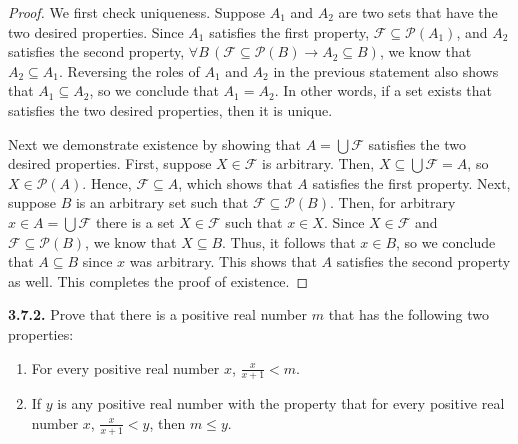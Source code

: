 \documentclass[12pt]{amsart}
\newenvironment{statement}[1]{\smallskip\noindent\color[rgb]{.6627, .3529, .6314} {\bf #1.}}{}
\theoremstyle{definition}
\theoremstyle{remark}
\newcommand{\powerset}[1]{\mathscr{P} \left( #1 \right)}
\begin{document}
\begin{proof}
We first check uniqueness.
Suppose $A_1$ and $A_2$ are two sets that have the two desired properties.
Since $A_1$ satisfies the first property, $\mathcal{F} \subseteq \powerset{A_1}$, and $A_2$ satisfies the second property, $\forall B \, (\mathcal{F} \subseteq \powerset{B} \rightarrow A_2 \subseteq B)$, we know that $A_2 \subseteq A_1$.
Reversing the roles of $A_1$ and $A_2$ in the previous statement also shows that $A_1 \subseteq A_2$, so we conclude that $A_1 = A_2$.
In other words, if a set exists that satisfies the two desired properties, then it is unique.

Next we demonstrate existence by showing that $A = \bigcup \mathcal{F}$ satisfies the two desired properties.
First, suppose $X \in \mathcal{F}$ is arbitrary.
Then, $X \subseteq \bigcup \mathcal{F} = A$, so $X \in \powerset{A}$.
Hence, $\mathcal{F} \subseteq A$, which shows that $A$ satisfies the first property.
Next, suppose $B$ is an arbitrary set such that $\mathcal{F} \subseteq \powerset{B}$.
Then, for arbitrary $x \in A = \bigcup \mathcal{F}$ there is a set $X \in \mathcal{F}$ such that $x \in X$.
Since $X \in \mathcal{F}$ and $\mathcal{F} \subseteq \powerset{B}$, we know that $X \subseteq B$.
Thus, it follows that $x \in B$, so we conclude that $A \subseteq B$ since $x$ was arbitrary.
This shows that $A$ satisfies the second property as well.
This completes the proof of existence.
\end{proof}


\begin{statement}{3.7.2}
Prove that there is a positive real number $m$ that has the following two properties:
\begin{enumerate}
	\item For every positive real number $x$, $\frac{x}{x + 1} < m$.
	
	\item If $y$ is any positive real number with the property that for every positive real number $x$,
	$\frac{x}{x + 1} < y$, then $m \leq y$.
\end{enumerate}
\end{statement}
\end{document}
